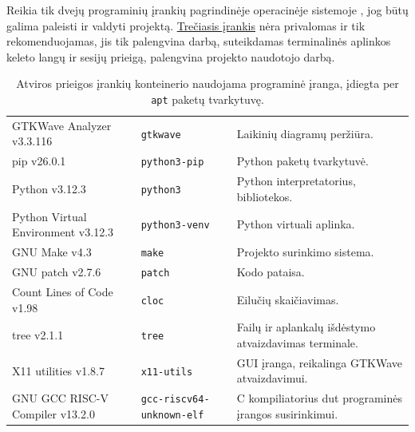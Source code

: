 Reikia tik dvejų programinių įrankių pagrindinėje operacinėje sistemoje \lent{\ref{tab:project-software-host}}, jog būtų galima paleisti ir valdyti projektą. \hyperref[tab:col:project-software-host-tmux]{Trečiasis įrankis} nėra privalomas ir tik rekomenduojamas, jis tik palengvina darbą, suteikdamas terminalinės aplinkos keleto langų ir sesijų prieigą, palengvina projekto naudotojo darbą.

\begin{table}[H]
	\caption{Atviros prieigos įrankių konteinerio naudojama programinė įranga, įdiegta per \texttt{apt} paketų tvarkytuvę.}
	\label{tab:project-software-ubuntu}
	\begin{tabularx}{\linewidth}{|>{\raggedright\arraybackslash}p{4cm}|X|>{\raggedright\arraybackslash}X|}
		\hline
		\thead[l]{Programinė įranga} & \thead{Paketo pavadinimas} & \thead{Paskirtis} \\ \hline
		GTKWave Analyzer v3.3.116 & \texttt{gtkwave}  & Laikinių diagramų peržiūra. \\ \hline
		pip v26.0.1 & \texttt{python3-pip}  & Python paketų tvarkytuvė. \\ \hline
		Python v3.12.3 & \texttt{python3}  & Python interpretatorius, bibliotekos. \\ \hline
		Python Virtual Environment v3.12.3 & \texttt{python3-venv} & Python virtuali aplinka. \\ \hline
		GNU Make v4.3 & \texttt{make} & Projekto surinkimo sistema. \\ \hline
		GNU patch v2.7.6 & \texttt{patch} & Kodo pataisa. \\ \hline
		Count Lines of Code v1.98 & \texttt{cloc}  & Eilučių skaičiavimas. \\ \hline
		tree v2.1.1 & \texttt{tree} & Failų ir aplankalų išdėstymo atvaizdavimas terminale. \\ \hline
		X11 utilities v1.8.7 & \texttt{x11-utils} & GUI įranga, reikalinga GTKWave atvaizdavimui. \\ \hline
		GNU GCC RISC-V Compiler v13.2.0& \texttt{gcc-riscv64-unknown-elf} & C kompiliatorius \gls{dut} programinės įrangos susirinkimui. \\ \hline
	\end{tabularx}
\end{table}

